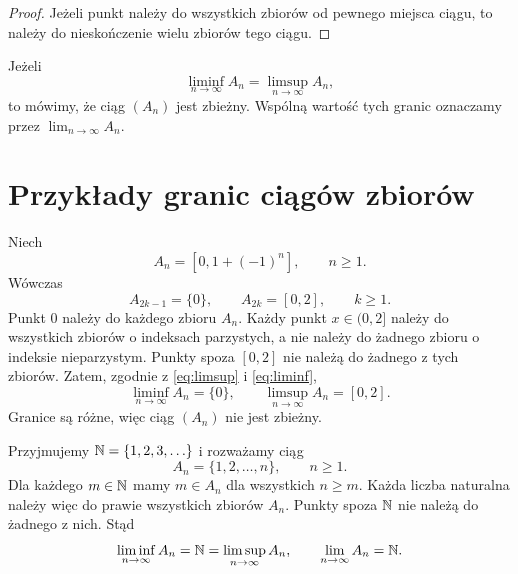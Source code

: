 \begin{proof}
Jeżeli punkt należy do wszystkich zbiorów od pewnego miejsca ciągu,
to należy do nieskończenie wielu zbiorów tego ciągu.
\end{proof}

\begin{definicja}
Jeżeli
\[
  \liminf_{n\to\infty}A_n=\limsup_{n\to\infty}A_n,
\]
to mówimy, że ciąg $(A_n)$ jest zbieżny. Wspólną wartość tych granic
oznaczamy przez $\lim_{n\to\infty}A_n$.
\end{definicja}

\section{Przykłady granic ciągów zbiorów}
\label{sec:przyklady-granic}

\begin{przyklad}
Niech
\[
  A_n=[0,1+(-1)^n],\qquad n\geq1.
\]
Wówczas
\[
  A_{2k-1}=\{0\},\qquad A_{2k}=[0,2],\qquad k\geq1.
\]
Punkt $0$ należy do każdego zbioru $A_n$. Każdy punkt $x\in(0,2]$ należy
do wszystkich zbiorów o indeksach parzystych, a nie należy do żadnego
zbioru o indeksie nieparzystym. Punkty spoza $[0,2]$ nie należą do
żadnego z tych zbiorów. Zatem, zgodnie z \eqref{eq:limsup} i \eqref{eq:liminf},
\begin{equation}
  \liminf_{n\to\infty}A_n=\{0\},\qquad
  \limsup_{n\to\infty}A_n=[0,2].
  \label{eq:przyklad-naprzemienny}
\end{equation}
Granice są różne, więc ciąg $(A_n)$ nie jest zbieżny.
\end{przyklad}

\begin{przyklad}
Przyjmujemy $\mathbb{N}=\{1,2,3,\ldots\}$ i rozważamy ciąg
\[
  A_n=\{1,2,\ldots,n\},\qquad n\geq1.
\]
Dla każdego $m\in\mathbb{N}$ mamy $m\in A_n$ dla wszystkich $n\geq m$.
Każda liczba naturalna należy więc do prawie wszystkich zbiorów $A_n$.
Punkty spoza $\mathbb{N}$ nie należą do żadnego z nich. Stąd
\begin{equation}
  \liminf_{n\to\infty}A_n=\mathbb{N}=\limsup_{n\to\infty}A_n,
  \qquad \lim_{n\to\infty}A_n=\mathbb{N}.
  \label{eq:przyklad-naturalne}
\end{equation}
\end{przyklad}
